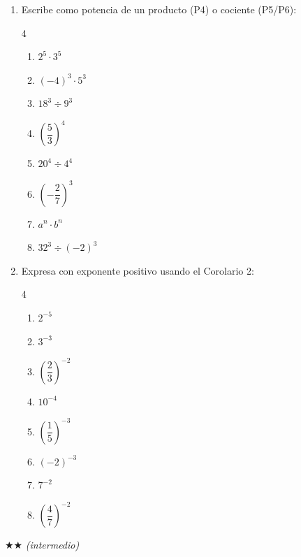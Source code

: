 \documentclass[11pt, letterpaper]{article}
\begin{document}
\begin{enumerate}[label=\textbf{\arabic*.}, leftmargin=*]
  \item Escribe como potencia de un producto (P4) o cociente (P5/P6):
  \begin{multicols}{4}
  \begin{enumerate}[label=\alph*)]
    \item $2^5\cdot 3^5$
    \item $(-4)^3\cdot 5^3$
    \item $18^3 \div 9^3$
    \item $\left(\dfrac{5}{3}\right)^4$
    \item $20^4 \div 4^4$
    \item $\left(-\dfrac{2}{7}\right)^3$
    \item $a^n\cdot b^n$
    \item $32^3 \div (-2)^3$
  \end{enumerate}
  \end{multicols}

  \item Expresa con exponente positivo usando el Corolario 2:
  \begin{multicols}{4}
  \begin{enumerate}[label=\alph*)]
    \item $2^{-5}$
    \item $3^{-3}$
    \item $\left(\dfrac{2}{3}\right)^{-2}$
    \item $10^{-4}$
    \item $\left(\dfrac{1}{5}\right)^{-3}$
    \item $(-2)^{-3}$
    \item $7^{-2}$
    \item $\left(\dfrac{4}{7}\right)^{-2}$
  \end{enumerate}
  \end{multicols}
\end{enumerate}

$\bigstar\bigstar$ \textit{(intermedio)}
\end{document}
